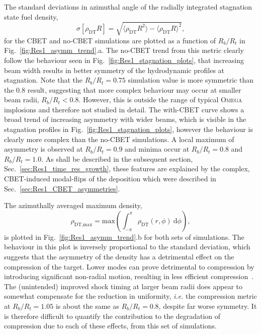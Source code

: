 The standard deviations in azimuthal angle of the radially integrated stagnation state fuel density,
\begin{equation}
    \sigma [\rho_{\text{DT}}R] = \sqrt{ \langle \rho_{\text{DT}}R^2 \rangle - \langle \rho_{\text{DT}}R \rangle^2 },
\end{equation}
for the \ac{CBET} and no-\ac{CBET} simulations are plotted as a function of $R_b/R_t$ in Fig.~\ref{fig:Res1_asymm_trend}.a.
The no-\ac{CBET} trend from this metric clearly follow the behaviour seen in Fig.~\ref{fig:Res1_stagnation_plots}, that increasing beam width results in better symmetry of the hydrodynamic profiles at stagnation.
Note that the $R_b/R_t=0.75$ simulation value is more symmetric than the $0.8$ result, suggesting that more complex behaviour may occur at smaller beam radii, $R_b/R_t<0.8$.
However, this is outside the range of typical \textsc{Omega} implosions and therefore not studied in detail.
The with-\ac{CBET} curve shows a broad trend of increasing asymmetry with wider beams, which is visible in the stagnation profiles in Fig.~\ref{fig:Res1_stagnation_plots}, however the behaviour is clearly more complex than the no-\ac{CBET} simulations.
A local maximum of asymmetry is observed at $R_b/R_t=0.9$ and minima occur at $R_b/R_t=0.8$ and $R_b/R_t=1.0$.
As shall be described in the subsequent section, Sec.~\ref{sec:Res1_time_res_growth}, these features are explained by the complex, \ac{CBET}-induced modal-flips of the deposition which were described in Sec.~\ref{sec:Res1_CBET_asymmetries}.

The azimuthally averaged maximum density,
\begin{equation}
    \rho_{\text{DT,max}} = \text{max}\left( \int_{-\pi}^{\pi} \rho_{\text{DT}}(r,\phi)\ \text{d}\phi \right),
\end{equation}
is plotted in Fig.~\ref{fig:Res1_asymm_trend}.b for both sets of simulations.
The behaviour in this plot is inversely proportional to the standard deviation, which suggests that the asymmetry of the density has a detrimental effect on the compression of the target.
Lower modes can prove detrimental to compression by introducing significant non-radial motion, resulting in less efficient compression~\cite{bose_physics_2017,bose_analysis_2018}.
The (unintended) improved shock timing at larger beam radii does appear to somewhat compensate for the reduction in uniformity, \textit{i.e.} the compression metric at $R_b/R_t=1.05$ is about the same as $R_b/R_t=0.8$, despite far worse symmetry.
It is therefore difficult to quantify the contribution to the degradation of compression due to each of these effects, from this set of simulations.

